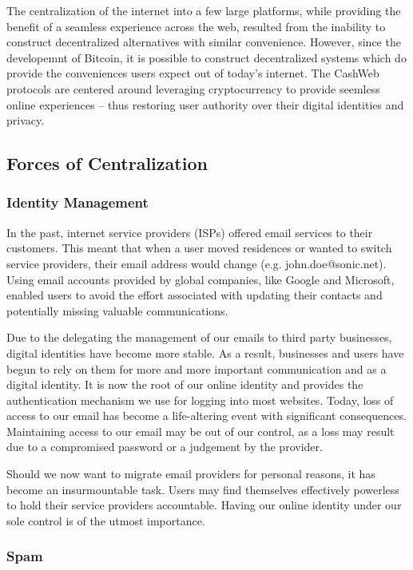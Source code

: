 \documentclass{article}
\begin{document}
The centralization of the internet into a few large platforms, while providing the benefit of a seamless experience across the web, resulted from the inability to construct decentralized alternatives with similar convenience. However, since the developemnt of Bitcoin\cite{nakamoto2008bpp}, it is possible to construct decentralized systems which do provide the conveniences users expect out of today's internet. The CashWeb protocols are centered around leveraging cryptocurrency to provide seemless online experiences -- thus restoring user authority over their digital identities and privacy. 

\subsection{Forces of Centralization}

\subsubsection{Identity Management}

In the past, internet service providers (ISPs) offered email services to their customers. This meant that when a user moved residences or wanted to switch service providers, their email address would change (e.g. john.doe@sonic.net). Using email accounts provided by global companies, like Google and Microsoft, enabled users to avoid the effort associated with updating their contacts and potentially missing valuable communications.

Due to the delegating the management of our emails to third party businesses, digital identities have become more stable. As a result, businesses and users have begun to rely on them for more and more important communication and as a digital identity. It is now the root of our online identity and provides the authentication mechanism we use for logging into most websites. Today, loss of access to our email has become a life-altering event with significant consequences. Maintaining access to our email may be out of our control, as a loss may result due to a compromised password or a judgement by the provider. 

Should we now want to migrate email providers for personal reasons, it has become an insurmountable task. Users may find themselves effectively powerless to hold their service providers accountable. Having our online identity under our sole control is of the utmost importance.

\subsubsection{Spam}
\end{document}
